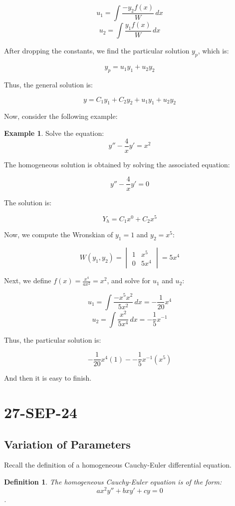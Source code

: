 \documentclass{article}
\newtheorem{defn}{Definition}
\theoremstyle{definition}
\newtheorem{example}{Example}[section]
\begin{document}
\[
u_1 = \int \frac{-y_2 f(x)}{W} \, dx
\]
\[
u_2 = \int \frac{y_1 f(x)}{W} \, dx
\]

After dropping the constants, we find the particular solution \( y_p \), which is:

\[
y_p = u_1 y_1 + u_2 y_2
\]

Thus, the general solution is:

\[
y = C_1 y_1 + C_2 y_2 + u_1 y_1 + u_2 y_2
\]

Now, consider the following example:

\begin{example}
Solve the equation:
\[
y'' - \frac{4}{x}y' = x^2
\]

The homogeneous solution is obtained by solving the associated equation:

\[
y'' - \frac{4}{x}y' = 0
\]

The solution is:

\[
Y_h = C_1 x^0 + C_2 x^{5}
\]

Now, we compute the Wronskian of \( y_1 = 1 \) and \( y_2 = x^{5} \):

\[
W(y_1, y_2) = 
\begin{vmatrix}
1 & x^{5} \\
0 & 5x^4
\end{vmatrix}
= 5x^4
\]

Next, we define \( f(x) = \frac{x^4}{ax^2} = x^2 \), and solve for \( u_1 \) and \( u_2 \):

\[
u_1 = \int \frac{-x^{5} x^2}{5x^2} \, dx = -\frac{1}{20}x^4
\]
\[
u_2 = \int \frac{x^2}{5x^4} \, dx = -\frac{1}{5}x^{-1}
\]

Thus, the particular solution is:

\[
    -\frac{1}{20}x^4(1) - -\frac{1}{5}x^{-1}(x^5)
\]

And then it is easy to finish. 
\end{example}

\section{27-SEP-24}
\subsection{Variation of Parameters}
Recall the definition of a homogeneous Cauchy-Euler differential equation.
\begin{defn}
    The homogeneous Cauchy-Euler equation is of the form:
    \[ ax^2y'' + bxy' + cy = 0 \]. 
\end{defn}
\end{document}
